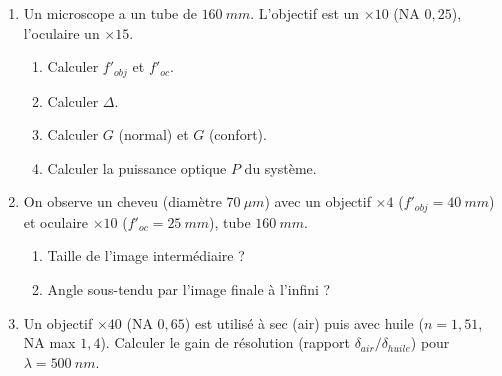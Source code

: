 \documentclass[11pt]{article}
\begin{document}
\begin{exercice}
\begin{enumerate}
    \item Un microscope a un tube de $\SI{160}{mm}$. L'objectif est un $\times 10$ (NA $0,25$), l'oculaire un $\times 15$.
        \begin{enumerate}
            \item Calculer $f'_{obj}$ et $f'_{oc}$.
            \item Calculer $\Delta$.
            \item Calculer $G$ (normal) et $G$ (confort).
            \item Calculer la puissance optique $P$ du système.
        \end{enumerate}
    \item On observe un cheveu (diamètre $\SI{70}{\mu m}$) avec un objectif $\times 4$ ($f'_{obj}=\SI{40}{mm}$) et oculaire $\times 10$ ($f'_{oc}=\SI{25}{mm}$), tube $\SI{160}{mm}$.
        \begin{enumerate}
            \item Taille de l'image intermédiaire ?
            \item Angle sous-tendu par l'image finale à l'infini ?
        \end{enumerate}
    \item Un objectif $\times 40$ (NA $0,65$) est utilisé à sec (air) puis avec huile ($n=1,51$, NA max $1,4$).
        Calculer le gain de résolution (rapport $\delta_{air}/\delta_{huile}$) pour $\lambda = \SI{500}{nm}$.
\end{enumerate}
\end{exercice}
\end{document}
